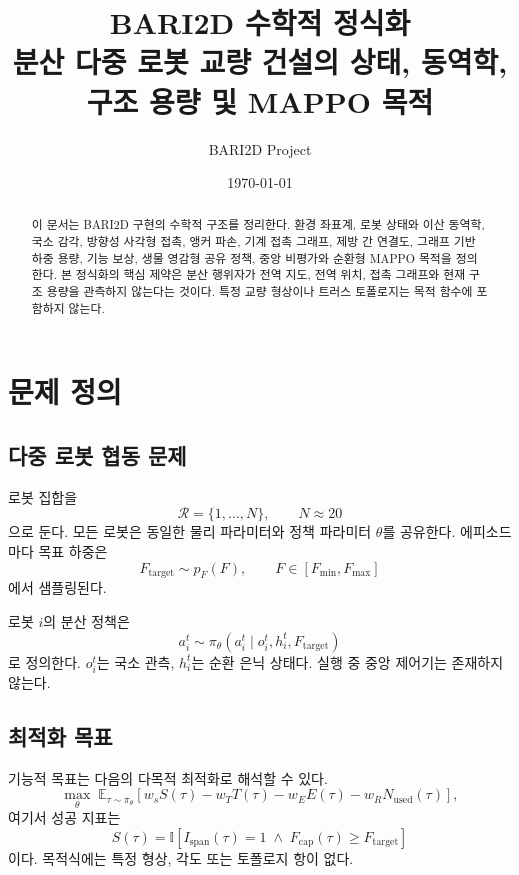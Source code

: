 \documentclass[11pt,a4paper]{article}
\title{\textbf{BARI2D 수학적 정식화}\\[4pt]
\large 분산 다중 로봇 교량 건설의 상태, 동역학, 구조 용량 및 MAPPO 목적}
\author{BARI2D Project}
\date{\today}
\newcommand{\I}{\mathbb{I}}
\newcommand{\Ftarget}{F_{\mathrm{target}}}
\newcommand{\Fcap}{F_{\mathrm{cap}}}
\newcommand{\Ispan}{I_{\mathrm{span}}}
\begin{document}
\maketitle

\begin{abstract}
이 문서는 BARI2D 구현의 수학적 구조를 정리한다. 환경 좌표계, 로봇 상태와 이산 동역학, 국소 감각, 방향성 사각형 접촉, 앵커 파손, 기계 접촉 그래프, 제방 간 연결도, 그래프 기반 하중 용량, 기능 보상, 생물 영감형 공유 정책, 중앙 비평가와 순환형 MAPPO 목적을 정의한다. 본 정식화의 핵심 제약은 분산 행위자가 전역 지도, 전역 위치, 접촉 그래프와 현재 구조 용량을 관측하지 않는다는 것이다. 특정 교량 형상이나 트러스 토폴로지는 목적 함수에 포함하지 않는다.
\end{abstract}

\tableofcontents

\newpage

\section{문제 정의}

\subsection{다중 로봇 협동 문제}

로봇 집합을
\begin{equation}
  \mathcal{R}=\{1,\ldots,N\}, \qquad N\approx 20
\end{equation}
으로 둔다. 모든 로봇은 동일한 물리 파라미터와 정책 파라미터 \(\theta\)를 공유한다. 에피소드마다 목표 하중은
\begin{equation}
  \Ftarget \sim p_F(F), \qquad
  F\in[F_{\min},F_{\max}]
\end{equation}
에서 샘플링된다.

로봇 \(i\)의 분산 정책은
\begin{equation}
  a_i^t \sim
  \pi_\theta\!\left(
    a_i^t\mid o_i^t,h_i^t,\Ftarget
  \right)
  \label{eq:decentralized-policy}
\end{equation}
로 정의한다. \(o_i^t\)는 국소 관측, \(h_i^t\)는 순환 은닉 상태다. 실행 중 중앙 제어기는 존재하지 않는다.

\subsection{최적화 목표}

기능적 목표는 다음의 다목적 최적화로 해석할 수 있다.
\begin{equation}
  \max_\theta\;
  \mathbb{E}_{\tau\sim\pi_\theta}
  \left[
    w_s S(\tau)
    -w_T T(\tau)
    -w_E E(\tau)
    -w_R N_{\mathrm{used}}(\tau)
  \right],
  \label{eq:global-objective}
\end{equation}
여기서 성공 지표는
\begin{equation}
  S(\tau)=
  \I\!\left[
    \Ispan(\tau)=1
    \;\land\;
    \Fcap(\tau)\ge\Ftarget
  \right]
  \label{eq:success}
\end{equation}
이다. 목적식에는 특정 형상, 각도 또는 토폴로지 항이 없다.
\end{document}
